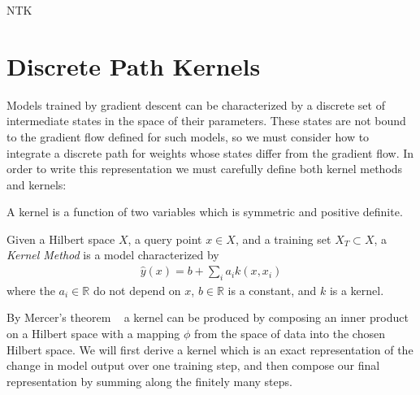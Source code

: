 \cite{he2020bayesian} NTK %

\section{Discrete Path Kernels}

Models trained by gradient descent can be characterized by a discrete set of intermediate states in the space of their parameters. These states are not bound to the gradient flow defined for such models, so we must consider how to integrate a discrete path for weights whose states differ from the gradient flow. In order to write this representation we must carefully define both kernel methods and kernels:

\begin{definition}
A {kernel} is a function of two variables which is symmetric and positive definite. 
\end{definition}

\begin{definition}
Given a Hilbert space $X$, a query point $x \in X$, and a training set $X_T \subset X$, a \emph{Kernel Method} is a model characterized by 
\begin{align}
    \hat y(x) = b + \sum_{i} a_i k(x,x_i)
\end{align}
where the $a_i \in \mathbb{R}$ do not depend on $x$, $b \in \mathbb{R}$ is a constant, and $k$ is a kernel. 
\end{definition}

By Mercer's theorem ~\cite{ghojogh2021} a kernel can be produced by composing an inner product on a Hilbert space with a mapping $\phi$ from the space of data into the chosen Hilbert space. We will first derive a kernel which is an exact representation of the change in model output over one training step, and then compose our final representation by summing along the finitely many steps. 

